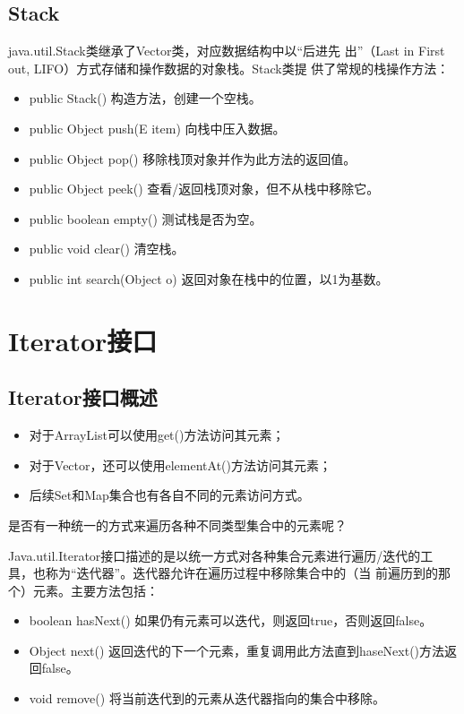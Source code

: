 \subsection{Stack}

java.util.Stack类继承了Vector类，对应数据结构中以{\hei\Blue “后进先
  出”（Last in First out, LIFO）方式存储和操作数据的对象栈}。Stack类提
供了常规的栈操作方法：

\begin{itemize}
\item public Stack() 构造方法，创建一个空栈。
\item public Object push(E item) 向栈中压入数据。
\item public Object pop() 移除栈顶对象并作为此方法的返回值。
\item public Object peek() 查看/返回栈顶对象，但不从栈中移除它。
\item public boolean empty() 测试栈是否为空。
\item public void clear() 清空栈。
\item public int search(Object o) 返回对象在栈中的位置，以1为基数。
\end{itemize}

\section{Iterator接口}

\subsection{Iterator接口概述}

\begin{itemize}
\item 对于ArrayList可以使用get()方法访问其元素；
\item 对于Vector，还可以使用elementAt()方法访问其元素；
\item 后续Set和Map集合也有各自不同的元素访问方式。
\end{itemize}

{\Blue\hei 是否有一种统一的方式来遍历各种不同类型集合中的元素呢？}

Java.util.Iterator接口描述的是以统一方式对各种集合元素进行遍历/迭代的工
具，也称为“{\Blue\hei 迭代器}”。迭代器允许在遍历过程中移除集合中的（当
前遍历到的那个）元素。主要方法包括：

\begin{itemize}
\item boolean hasNext() 如果仍有元素可以迭代，则返回true，否则返回false。
\item Object next() 返回迭代的下一个元素，重复调用此方法直到haseNext()方法返回false。
\item void remove() 将当前迭代到的元素从迭代器指向的集合中移除。
\end{itemize}

